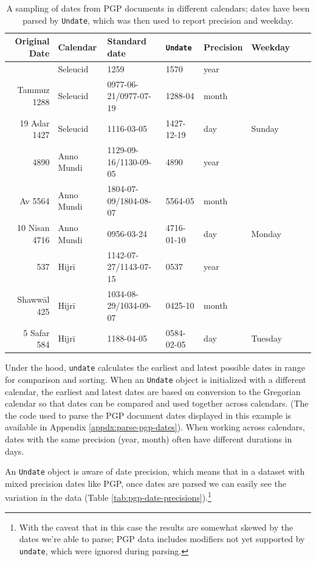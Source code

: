 \documentclass{anthology-ch}         %
\begin{document}
\begin{table}[h]
  \centering 
  \begin{tabular}{rlllllll}
    \toprule
Original Date & Calendar & Standard date & \texttt{Undate} & Precision & Weekday \\ 
\midrule\addlinespace[2.5pt]
1570 & Seleucid & 1259 & 1570 & year &  \\
Tammuz 1288 & Seleucid & 0977-06-21/0977-07-19 & 1288-04 & month &  \\
19 Adar 1427 & Seleucid & 1116-03-05 & 1427-12-19 & day & Sunday \\
\midrule
4890 & Anno Mundi & 1129-09-16/1130-09-05 & 4890 & year &  \\
Av 5564 & Anno Mundi & 1804-07-09/1804-08-07 & 5564-05 & month &  \\
10 Nisan 4716 & Anno Mundi & 0956-03-24 & 4716-01-10 & day & Monday \\
\midrule
537 & Hijrī & 1142-07-27/1143-07-15 & 0537 & year &  \\
Shawwāl 425 & Hijrī & 1034-08-29/1034-09-07 & 0425-10 & month &  \\
5 Safar 584 & Hijrī & 1188-04-05 & 0584-02-05 & day & Tuesday \\
\bottomrule
    \bottomrule
  \end{tabular}
  \caption{A sampling of dates from PGP documents in different calendars; dates have been parsed by \texttt{Undate}, which was then used to report precision and weekday.}
  \label{tab:pgp-parsed-dates}
\end{table}

Under the hood, \texttt{undate} calculates the earliest and latest possible dates in range for comparison and sorting. When an \texttt{Undate} object is initialized with a different calendar, the earliest and latest dates are based on conversion to the Gregorian calendar so that dates can be compared and used together across calendars. (The the code used to parse the PGP document dates displayed in this example is available in Appendix \ref{appdx:parse-pgp-dates}). When working across calendars, dates with the same precision (year, month) often have different durations in days.

An \texttt{Undate} object is aware of date precision, which means that in a dataset with mixed precision dates like PGP, once dates are parsed we can easily see the variation in the data (Table \ref{tab:pgp-date-precisions}).\footnote{With the caveat that in this case the results are somewhat skewed by the dates we're able to parse; PGP data includes modifiers not yet supported by \texttt{undate}, which were ignored during parsing.}
\end{document}
